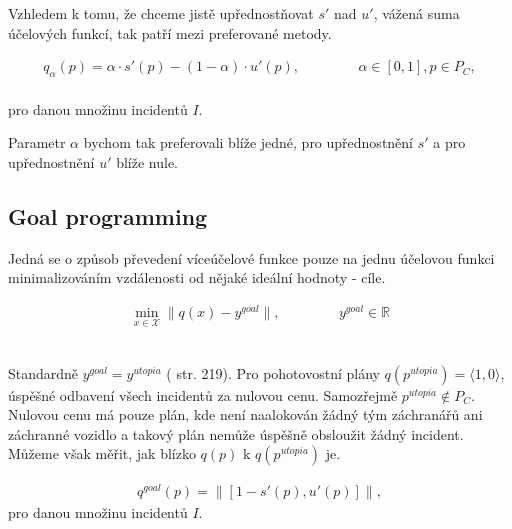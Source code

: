 Vzhledem k tomu, že chceme jistě upřednostňovat $s'$ nad $u'$, vážená suma účelových funkcí, tak patří mezi preferované metody.

\begin{definice}\label{df:vazenaSumaPohotovost}
  \begin{align*}
    q_{\alpha}(p) = \alpha \cdot s'(p) - (1 - \alpha) \cdot u'(p), \hspace{50pt} \alpha \in [0, 1], p \in P_C,
  \end{align*}
  \\
  pro danou množinu incidentů $I$.
  \\
\end{definice}

Parametr $\alpha$ bychom tak preferovali blíže jedné, pro upřednostnění $s'$ a pro upřednostnění $u'$ blíže nule.

\subsection{Goal programming}\label{kap:goalP}

Jedná se o způsob převedení víceúčelové funkce pouze na jednu účelovou funkci minimalizováním vzdálenosti od nějaké ideální hodnoty - cíle. 

\begin{definice}
  \begin{align*}
    \min_{x \in \mathcal{X}} \| q(x) - y^{goal} \|, \hspace{50pt} y^{goal} \in \mathbb{R}
  \end{align*}
  \\
\end{definice}

Standardně $y^{goal} = y^{utopia}$ (\cite{AlgOptBook} str. 219).
Pro pohotovostní plány $q(p^{utopia}) = \langle 1, 0 \rangle$, úspěšné odbavení všech incidentů za nulovou cenu.
Samozřejmě $p^{utopia} \not \in P_C$.
Nulovou cenu má pouze plán, kde není naalokován žádný tým záchranářů ani záchranné vozidlo a takový plán nemůže úspěšně obsloužit žádný incident. 
Můžeme však měřit, jak blízko $q(p)$ k $q(p^{utopia})$ je.

\begin{definice}
  \begin{align*}
    q^{goal}(p) = \| [1 - s'(p), u'(p)] \|,
  \end{align*}
  pro danou množinu incidentů $I$.
  \\
\end{definice}

